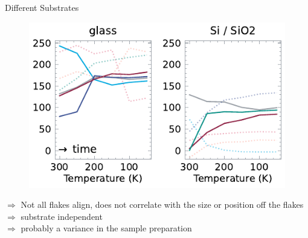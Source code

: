 \documentclass[
	10pt,
]{beamer}
\begin{document}
\begin{frame}{Different Substrates}
	\begin{figure}
		\centering
		\includegraphics[width=\textwidth]{../figures/2024-01-29 rotating pl.pdf}
	\end{figure}
	{\color{seeblau}$\Rightarrow$} Not all flakes align, does not correlate with the size or position off the flakes\\
	{\color{seeblau}$\Rightarrow$} substrate independent\\
	{\color{seeblau}$\Rightarrow$} probably a variance in the sample preparation
\end{frame}
\end{document}
